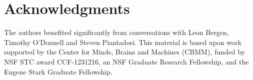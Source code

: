 \documentclass[10pt,letterpaper]{article}
\begin{document}
\section{Acknowledgments}

The authors benefited significantly from conversations with Leon
Bergen, Timothy O'Donnell and Steven Piantadosi. This material is
based upon work supported by the Center for Minds, Brains and Machines
(CBMM), funded by NSF STC award CCF-1231216, an NSF Graduate Research
Fellowship, and the Eugene Stark Graduate Fellowship.




\setlength{\bibleftmargin}{.125in}
\setlength{\bibindent}{-\bibleftmargin}

\end{document}
